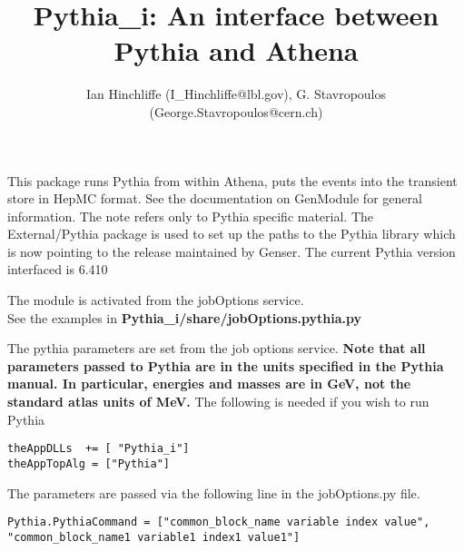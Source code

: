 \documentclass[11pt]{article}
\begin{document}
\title{Pythia\_i: An interface between Pythia and Athena}
\author{ Ian Hinchliffe (I\_Hinchliffe@lbl.gov), G. Stavropoulos (George.Stavropoulos@cern.ch)}

\maketitle           

This package runs Pythia from within Athena, puts the events into the
transient store in HepMC format. See the documentation on GenModule  for
general information. The note refers only to Pythia specific
material. The External/Pythia package is used to set up the paths to
the Pythia  library which is now pointing to the release maintained by
Genser. The current Pythia version interfaced is 6.410

The module is activated from the jobOptions service. \\See the examples
in {\bf Pythia\_i/share/jobOptions.pythia.py }

The pythia parameters are set from the job options service.
{\bf Note that all parameters passed to Pythia are in the units
  specified in the Pythia manual. In particular, energies and
  masses are in GeV, not the standard atlas units of MeV.}
The following is needed if you wish to run Pythia
\begin{verbatim}
theAppDLLs  += [ "Pythia_i"]
theAppTopAlg = ["Pythia"]
\end{verbatim}
The parameters are passed via the following line in the jobOptions.py
file.

\begin{verbatim}Pythia.PythiaCommand = ["common_block_name variable index value", 
"common_block_name1 variable1 index1 value1"]
\end{verbatim} 
\end{document}
